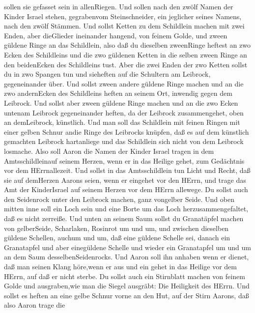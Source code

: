 sollen sie gefasset sein in allenRiegen.  Und sollen nach
den zwölf Namen der Kinder Israel stehen, gegrabenvom Steinschneider,
ein jeglicher seines Namens, nach den zwölf Stämmen.  Und
sollst Ketten zu dem Schildlein machen mit zwei Enden, aber dieGlieder
ineinander hangend, von feinem Golde,  und zween güldene
Ringe an das Schildlein, also daß du dieselben zweenRinge heftest an zwo
Ecken des Schildleins  und die zwo güldenen Ketten in die
selben zween Ringe an den beidenEcken des Schildleins tust.
 Aber die zwei Enden der zwo Ketten sollst du in zwo
Spangen tun und sieheften auf die Schultern am Leibrock, gegeneinander
über.  Und sollst zween andere güldene Ringe machen und an
die zwo andernEcken des Schildleins heften an seinem Ort, inwendig gegen
dem Leibrock.  Und sollst aber zween güldene Ringe machen
und an die zwo Ecken untenam Leibrock gegeneinander heften, da der
Leibrock zusammengehet, oben an demLeibrock, künstlich. 
Und man soll das Schildlein mit feinen Ringen mit einer gelben Schnur
andie Ringe des Leibrocks knüpfen, daß es auf dem künstlich gemachten
Leibrock hartanliege und das Schildlein sich nicht von dem Leibrock
losmache.  Also soll Aaron die Namen der Kinder Israel
tragen in dem Amtsschildleinauf seinem Herzen, wenn er in das Heilige
gehet, zum Gedächtnis vor dem HErrnallezeit.  Und sollst in
das Amtsschildlein tun Licht und Recht, daß sie auf demHerzen Aarons
seien, wenn er eingehet vor den HErrn, und trage das Amt der
KinderIsrael auf seinem Herzen vor dem HErrn allewege.  Du
sollst auch den Seidenrock unter den Leibrock machen, ganz vongelber
Seide.  Und oben mitten inne soll ein Loch sein und eine
Borte um das Loch herzusammengefaltet, daß es nicht zerreiße.
 Und unten an seinem Saum sollst du Granatäpfel machen von
gelberSeide, Scharlaken, Rosinrot um und um, und zwischen dieselben
güldene Schellen, auchum und um,  daß eine güldene Schelle
sei, danach ein Granatapfel und aber einegüldene Schelle und wieder ein
Granatapfel um und um an dem Saum desselbenSeidenrocks. 
Und Aaron soll ihn anhaben wenn er dienet, daß man seinen Klang
höre,wenn er aus und ein gehet in das Heilige vor dem HErrn, auf daß er
nicht sterbe.  Du sollst auch ein Stirnblatt machen von
feinem Golde und ausgraben,wie man die Siegel ausgräbt: Die Heiligkeit
des HErrn.  Und sollst es heften an eine gelbe Schnur vorne
an den Hut,  auf der Stirn Aarons, daß also Aaron trage die
